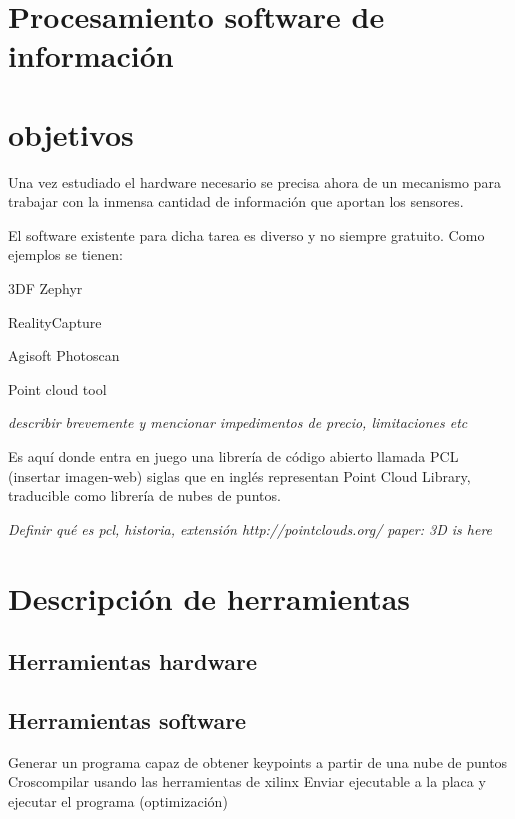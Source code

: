 \section{Procesamiento software de información }
\section{objetivos}
Una vez estudiado el hardware necesario se precisa ahora de un mecanismo para trabajar con la inmensa cantidad de información que aportan los sensores. 

El software existente para dicha tarea es diverso y no siempre gratuito. Como ejemplos se tienen:
\begin{list}{-}
\item 3DF Zephyr
\item RealityCapture
\item Agisoft Photoscan
\item Point cloud tool

\textit{describir brevemente y mencionar impedimentos de precio, limitaciones etc
}
\end{list}




Es aquí donde entra en juego una librería de código abierto llamada PCL (insertar imagen-web) siglas que en inglés representan Point Cloud Library, traducible como librería de nubes de puntos.

\textit{Definir qué es pcl, historia, extensión
http://pointclouds.org/
paper: 3D is here}


\section{Descripción de herramientas}
\subsection{Herramientas hardware}
\subsection{Herramientas software}


Generar un programa capaz de obtener keypoints a partir de una nube de puntos
Croscompilar usando las herramientas de xilinx 
Enviar ejecutable a la placa y ejecutar el programa
(optimización)

